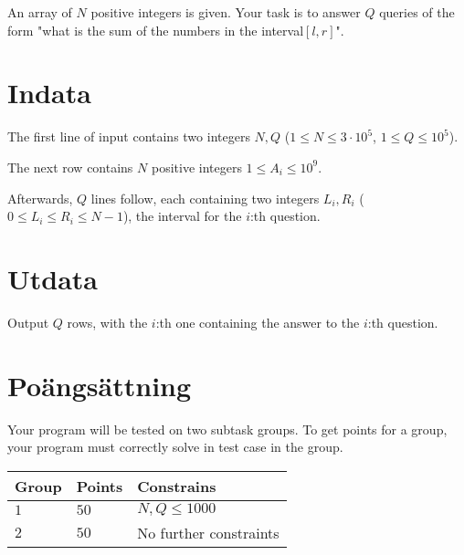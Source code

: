 An array of $N$ positive integers is given. Your task is to answer $Q$ queries
of the form "what is the sum of the numbers in the interval$[l,r]$".

\section*{Indata}
The first line of input contains two integers $N, Q$ ($1 \leq N \leq 3 \cdot 10^5$, $1 \leq Q \leq 10^5$).

The next row contains $N$ positive integers $1 \leq A_i \leq 10^9$.

Afterwards, $Q$ lines follow, each containing two integers $L_{i},R_{i}$ ($0 \leq L_{i} \leq R_{i} \leq N-1$), the
interval for the $i$:th question.

\section*{Utdata}
Output $Q$ rows, with the $i$:th one containing the answer to the $i$:th question.

\section*{Poängsättning}
Your program will be tested on two subtask groups.
\noindent
To get points for a group, your program must correctly solve in test case in the group.

\noindent
\begin{tabular}{| l | l | l |}
\hline
  Group & Points & Constrains \\ \hline
  $1$    & $50$       &  $N,Q \leq 1000$ \\ \hline
  $2$    & $50$       &  No further constraints \\ \hline
\end{tabular}
